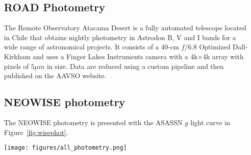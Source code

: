 \documentclass{aa}
\begin{document}
%
%
%
%

\subsection{ROAD Photometry}

The Remote Observatory Atacama Desert \citep[ROAD; ][]{Hambsch12} is a fully automated telescope located in Chile that obtains nightly photometry in Astrodon B, V and I bands for a wide range of astronomical projects.
%
It consists of a 40-cm $f/6.8$ Optimized Dall-Kirkham and uses a Finger Lakes Instruments camera with a 4k$\times$4k array with pixels of $5\mu m$ in size.
%
Data are reduced using a custom pipeline and then published on the AAVSO website.

\subsection{NEOWISE photometry}

The NEOWISE photometry is presented with the ASASSN $g$ light curve in Figure~\ref{fig:wisephot}.

\begin{figure*}
\begin{centering}
\texttt{[image: figures/all\_photometry.png]}
\caption{NEOWISE $W1$ and $W2$ photometry of the star, with the WISE color in the lowest panel.
%
The $NEOWISE$ color changes from colourless to very red, which now fades back towards colourless over $\sim 500$ days.
}
\label{fig:wisephot}
\end{centering}
\end{figure*}
\end{document}
